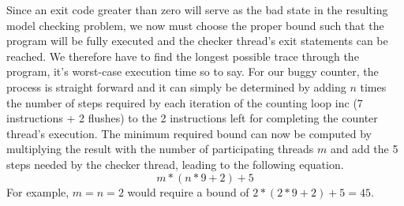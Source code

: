Since an exit code greater than zero will serve as the bad state in the resulting model checking problem, we now must choose the proper bound
such that the program will be fully executed
and the checker thread's exit statements can be reached.
We therefore have to find the longest possible trace through the program, it's worst-case execution time so to say.
For our buggy counter, the process is straight forward and it can simply be determined by adding $n$ times the number of steps required by each iteration of the counting loop {\color{red!60!black}\textsf{inc}} (7 instructions + 2 flushes) to the 2 instructions left for completing the counter thread's execution.
The minimum required bound can now be computed by multiplying the result with the number of participating threads $m$ and add the 5 steps needed by the checker thread, leading to the following equation.
\[
  m * (n * 9 + 2) + 5
\]
For example, $m = n = 2$ would require a bound of $2 * (2 * 9 + 2) + 5 = 45$.


